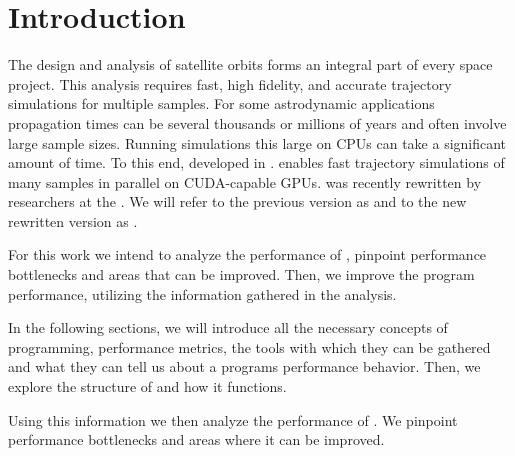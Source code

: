 \chapter{Introduction}
The design and analysis of satellite orbits forms an integral part of every space project.
This analysis requires fast, high fidelity, and accurate trajectory simulations for multiple samples.
For some astrodynamic applications propagation times can be several thousands or millions of years and often involve large sample sizes.
Running simulations this large on CPUs can take a significant amount of time.
To this end, \citeauthor{geda_massive_2019} developed \cudaj in \citeyear{geda_massive_2019}\cite{geda_massive_2019}.
\cudaj enables fast trajectory simulations of many samples in parallel on CUDA-capable GPUs.
\cudaj was recently rewritten by researchers at the \esoc.
We will refer to the previous version as  and to the new rewritten version as .

For this work we intend to analyze the performance of , pinpoint performance bottlenecks and areas that can be improved.
Then, we improve the program performance, utilizing the information gathered in the analysis.

In the following sections, we will introduce all the necessary concepts of \cuda programming, performance metrics, the tools with which they can be gathered and what they can tell us about a programs performance behavior.
Then, we explore the structure of  and how it functions.

Using this information we then analyze the performance of .
We pinpoint performance bottlenecks and areas where it can be improved.

